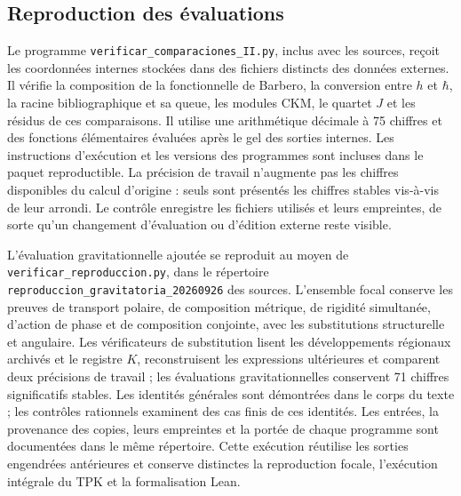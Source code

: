 \subsection{Reproduction des évaluations}

Le programme \texttt{verificar\_comparaciones\_II.py}, inclus avec les
sources, reçoit les coordonnées internes stockées dans des fichiers distincts
des données externes. Il vérifie la composition de la fonctionnelle de Barbero,
la conversion entre \(h\) et \(\hbar\), la racine bibliographique et sa queue,
les modules CKM, le quartet \(J\) et les résidus de ces comparaisons. Il utilise
une arithmétique décimale à 75 chiffres et des fonctions élémentaires évaluées après
le gel des sorties internes. Les instructions d’exécution
et les versions des programmes sont incluses dans le paquet reproductible.
La précision de travail n’augmente pas les chiffres disponibles du
calcul d’origine : seuls sont présentés les chiffres stables vis-à-vis de leur arrondi.
Le contrôle enregistre les fichiers utilisés et leurs empreintes, de sorte
qu’un changement d’évaluation ou d’édition externe reste visible.

L’évaluation gravitationnelle ajoutée se reproduit au moyen de
\texttt{verificar\_reproduccion.py}, dans le répertoire
\texttt{reproduccion\_gravitatoria\_20260926} des sources.
L’ensemble focal conserve les preuves de transport polaire, de composition
métrique, de rigidité simultanée, d’action de phase et de composition conjointe,
avec les substitutions structurelle et angulaire. Les vérificateurs
de substitution lisent les développements régionaux archivés et le registre
\(K\), reconstruisent les expressions ultérieures et comparent deux précisions
de travail ; les évaluations gravitationnelles conservent 71 chiffres
significatifs stables. Les identités générales sont démontrées dans le
corps du texte ; les contrôles rationnels examinent des cas finis de ces identités.
Les entrées, la provenance des copies, leurs empreintes et la portée de
chaque programme sont documentées dans le même répertoire. Cette exécution
réutilise les sorties engendrées antérieures et conserve distinctes la
reproduction focale, l’exécution intégrale du TPK et la formalisation Lean.

